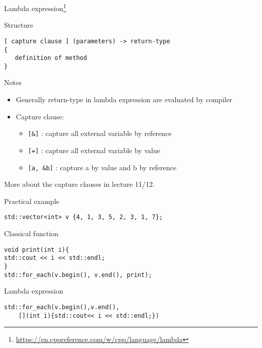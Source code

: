 \documentclass[\classoption]{beamer}
\begin{document}
\begin{frame}[fragile]{Lambda expression\footnote{\tiny{\url{https://en.cppreference.com/w/cpp/language/lambda}}} }

\begin{block}{Structure}
\begin{lstlisting}
[ capture clause ] (parameters) -> return-type  
{   
   definition of method   
} 
\end{lstlisting}
\end{block}

\begin{block}{Notes}
\begin{itemize}
\item Generally return-type in lambda expression are evaluated by compiler
\item Capture clause:
\begin{itemize}
\item  \lstinline|[&]| : capture all external variable by reference
\item  \lstinline|[=]| : capture all external variable by value
\item  \lstinline|[a, &b]| : capture a by value and b by reference
\end{itemize}
\end{itemize}
\end{block}
\vspace{-0.2cm}
\begin{center}
More about the capture clauses in lecture 11/12.
\end{center}
\end{frame}

\begin{frame}[fragile]{Practical example}
\begin{lstlisting}
std::vector<int> v {4, 1, 3, 5, 2, 3, 1, 7}; 

\end{lstlisting}


\begin{block}{Classical function}
\begin{lstlisting}
void print(int i){
std::cout << i << std::endl;
}
std::for_each(v.begin(), v.end(), print); 
\end{lstlisting}
\end{block}

\begin{block}{Lambda expression}
\begin{lstlisting}
std::for_each(v.begin(),v.end(),
	[](int i){std::cout<< i << std::endl;})
\end{lstlisting}
\end{block}


\end{frame}
     
\end{document}

